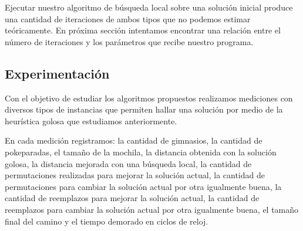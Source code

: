 Ejecutar nuestro algoritmo de b\'usqueda local sobre una soluci\'on inicial produce una cantidad de iteraciones de ambos tipos que no podemos estimar te\'oricamente. En pr\'oxima secci\'on intentamos encontrar una relaci\'on entre el n\'umero de iteraciones y los par\'ametros que recibe nuestro programa.

\subsection{Experimentación}


Con el objetivo de estudiar los algoritmos propuestos realizamos mediciones con diversos tipos de instancias que permiten hallar una soluci\'on por medio de la heur\'istica golosa que estudiamos anteriormente.

En cada medici\'on registramos: la cantidad de gimnasios, la cantidad de pokeparadas, el tamaño de la mochila, la distancia obtenida con la soluci\'on golosa, la distancia mejorada con una b\'usqueda local, la cantidad de permutaciones realizadas para mejorar la soluci\'on actual, la cantidad de permutaciones para cambiar la soluci\'on actual por otra igualmente buena, la cantidad de reemplazos para mejorar la soluci\'on actual, la cantidad de reemplazos para cambiar la soluci\'on actual por otra igualmente buena, el tamaño final del camino y el tiempo demorado en ciclos de reloj.


